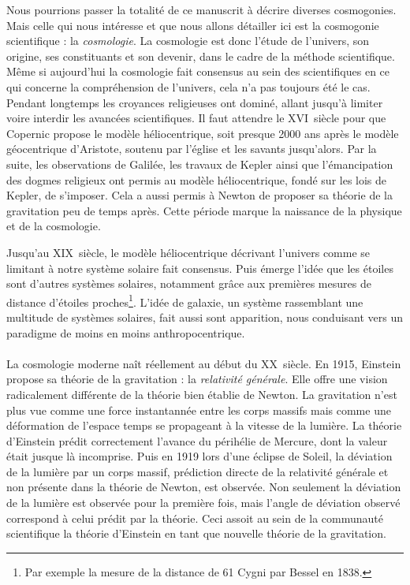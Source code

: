 \documentclass[11pt, twoside, a4paper, openright]{report}
\begin{document}
Nous pourrions passer la totalité de ce manuscrit à décrire diverses cosmogonies. Mais celle qui nous intéresse et que nous allons détailler ici est la cosmogonie scientifique : la \emph{cosmologie}. La cosmologie est donc l'étude de l'univers, son origine, ses constituants et son devenir, dans le cadre de la méthode scientifique. Même si aujourd'hui la cosmologie fait consensus au sein des scientifiques en ce qui concerne la compréhension de l'univers, cela n'a pas toujours été le cas. Pendant longtemps les croyances religieuses ont dominé, allant jusqu'à limiter voire interdir les avancées scientifiques.
Il faut attendre le \textsc{XVI}\ieme~siècle pour que Copernic propose le modèle héliocentrique, soit presque \num{2000} ans après le modèle géocentrique d'Aristote, soutenu par l'église et les savants jusqu'alors.
Par la suite, les observations de Galilée, les travaux de Kepler ainsi que l'émancipation des dogmes religieux ont permis au modèle héliocentrique, fondé sur les lois de Kepler, de s'imposer. Cela a aussi permis à Newton de proposer sa théorie de la gravitation peu de temps après. Cette période marque la naissance de la physique et de la cosmologie.

Jusqu'au \textsc{XIX}\ieme~siècle, le modèle héliocentrique décrivant l'univers comme se limitant à notre système solaire fait consensus. Puis émerge l'idée que les étoiles sont d'autres systèmes solaires, notamment grâce aux premières mesures de distance d'étoiles proches\footnote{Par exemple la mesure de la distance de 61 Cygni par Bessel en 1838.}. L'idée de galaxie, un système rassemblant une multitude de systèmes solaires, fait aussi sont apparition, nous conduisant vers un paradigme de moins en moins anthropocentrique.

\paragraph{}
La cosmologie moderne naît réellement au début du \textsc{XX}\ieme~siècle. En 1915, Einstein propose sa théorie de la gravitation : la \emph{relativité générale}. Elle offre une vision radicalement différente de la théorie bien établie de Newton. La gravitation n'est plus vue comme une force instantannée entre les corps massifs mais comme une déformation de l'espace temps se propageant à la vitesse de la lumière. La théorie d'Einstein prédit correctement l'avance du périhélie de Mercure, dont la valeur était jusque là incomprise. Puis en 1919 lors d'une éclipse de Soleil, la déviation de la lumière par un corps massif, prédiction directe de la relativité générale et non présente dans la théorie de Newton, est observée. Non seulement la déviation de la lumière est observée pour la première fois, mais l'angle de déviation observé correspond à celui prédit par la théorie. Ceci assoit au sein de la communauté scientifique la théorie d'Einstein en tant que nouvelle théorie de la gravitation.
\end{document}

